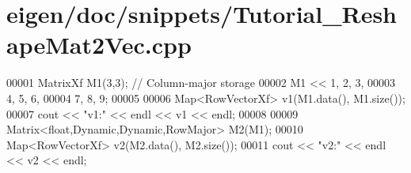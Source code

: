\hypertarget{eigen_2doc_2snippets_2_tutorial___reshape_mat2_vec_8cpp_source}{}\section{eigen/doc/snippets/\+Tutorial\+\_\+\+Reshape\+Mat2\+Vec.cpp}
\label{eigen_2doc_2snippets_2_tutorial___reshape_mat2_vec_8cpp_source}

\begin{DoxyCode}
00001 MatrixXf M1(3,3);    \textcolor{comment}{// Column-major storage}
00002 M1 << 1, 2, 3,
00003       4, 5, 6,
00004       7, 8, 9;
00005 
00006 Map<RowVectorXf> v1(M1.data(), M1.size());
00007 cout << \textcolor{stringliteral}{"v1:"} << endl << v1 << endl;
00008 
00009 Matrix<float,Dynamic,Dynamic,RowMajor> M2(M1);
00010 Map<RowVectorXf> v2(M2.data(), M2.size());
00011 cout << \textcolor{stringliteral}{"v2:"} << endl << v2 << endl;
\end{DoxyCode}
